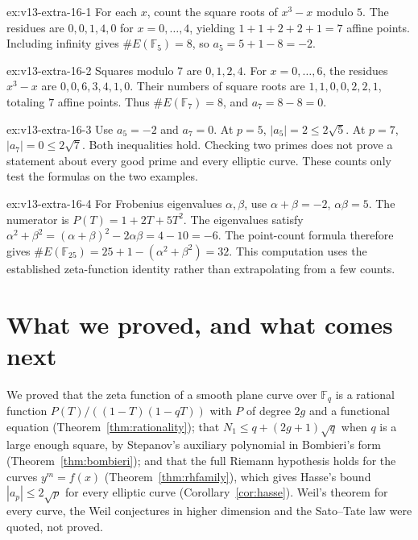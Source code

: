 \begin{solution}{ex:v13-extra-16-1}
\idea For each $x$, count the square roots of $x^3-x$ modulo $5$.
\writeup The residues are $0,0,1,4,0$ for $x=0,\ldots,4$, yielding $1+1+2+2+1=7$ affine points. Including infinity gives $\#E(\mathbb F_5)=8$, so $a_5=5+1-8=-2$.
\end{solution}

\begin{solution}{ex:v13-extra-16-2}
\idea Squares modulo $7$ are $0,1,2,4$.
\writeup For $x=0,\ldots,6$, the residues $x^3-x$ are $0,0,6,3,4,1,0$. Their numbers of square roots are $1,1,0,0,2,2,1$, totaling $7$ affine points. Thus $\#E(\mathbb F_7)=8$, and $a_7=8-8=0$.
\end{solution}

\begin{solution}{ex:v13-extra-16-3}
\idea Use $a_5=-2$ and $a_7=0$.
\writeup At $p=5$, $|a_5|=2\le2\sqrt5$. At $p=7$, $|a_7|=0\le2\sqrt7$. Both inequalities hold. Checking two primes does not prove a statement about every good prime and every elliptic curve. These counts only test the formulas on the two examples.
\end{solution}

\begin{solution}{ex:v13-extra-16-4}
\idea For Frobenius eigenvalues $\alpha,\beta$, use $\alpha+\beta=-2$, $\alpha\beta=5$.
\writeup The numerator is $P(T)=1+2T+5T^2$. The eigenvalues satisfy $\alpha^2+\beta^2=(\alpha+\beta)^2-2\alpha\beta=4-10=-6$. The point-count formula therefore gives $\#E(\mathbb F_{25})=25+1-(\alpha^2+\beta^2)=32$. This computation uses the established zeta-function identity rather than extrapolating from a few counts.
\end{solution}

\section{What we proved, and what comes next}

We proved that the zeta function of a smooth plane curve over $\mathbb F_q$ is a rational function $P(T)/((1-T)(1-qT))$ with $P$ of degree $2g$ and a functional
equation (Theorem~\ref{thm:rationality}); that $N_1\le q+(2g+1)\sqrt q$ when $q$ is a large enough square, by Stepanov's auxiliary polynomial in Bombieri's form
(Theorem~\ref{thm:bombieri}); and that the full Riemann hypothesis holds for the curves $y^m=f(x)$ (Theorem~\ref{thm:rhfamily}), which gives Hasse's bound
$|a_p|\le2\sqrt p$ for every elliptic curve (Corollary~\ref{cor:hasse}). Weil's theorem for every curve, the Weil conjectures in higher dimension and the
Sato--Tate law were quoted, not proved.

